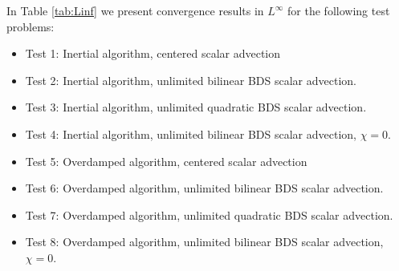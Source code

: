 \documentclass[final]{siamltex}
\begin{document}
In Table \ref{tab:Linf} we present convergence results in $L^\infty$ for the 
following test problems:
\begin{itemize}
\item Test 1: Inertial algorithm, centered scalar advection
\item Test 2: Inertial algorithm, unlimited bilinear BDS scalar advection.
\item Test 3: Inertial algorithm, unlimited quadratic BDS scalar advection.
\item Test 4: Inertial algorithm, unlimited bilinear BDS scalar advection, $\chi=0$.
\item Test 5: Overdamped algorithm, centered scalar advection
\item Test 6: Overdamped algorithm, unlimited bilinear BDS scalar advection.
\item Test 7: Overdamped algorithm, unlimited quadratic BDS scalar advection.
\item Test 8: Overdamped algorithm, unlimited bilinear BDS scalar advection, $\chi=0$.
\end{itemize}
\end{document}
